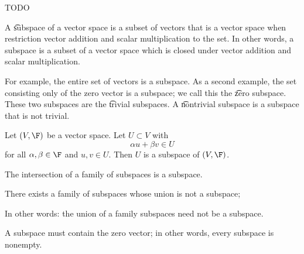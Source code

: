 

TODO


A \t{subspace} of a vector space is a subset of vectors that is a vector space when restriction vector addition and scalar multiplication to the set.
In other words, a subspace is a subset of a vector space which is closed under vector addition and scalar multiplication.

For example, the entire set of vectors is a subspace.
As a second example, the set consisting only of the zero vector is a subspace; we call this the \t{zero subspace}.
These two subspaces are the \t{trivial subspaces}.
A \t{nontrivial subspace} is a subspace that is not trivial.


Let $(V, \F)$ be a vector space.
Let $U \subset V$ with
$$
  \alpha u + \beta v \in U
$$
for all $\alpha, \beta \in \F$ and $u, v \in U$.
Then $U$ is a subspace of $(V, \F)$.


\begin{prop}
  The intersection of a family of subspaces is a subspace.
\end{prop}

\begin{prop}
  There exists a family of subspaces whose union is not a subspace;

  \begin{remark}
  In other words: the union of a family subspaces need not be a subspace.
  \end{remark}
\end{prop}

\begin{prop}
  A subspace must contain the zero vector; in other words, every subspace is nonempty.
\end{prop}
